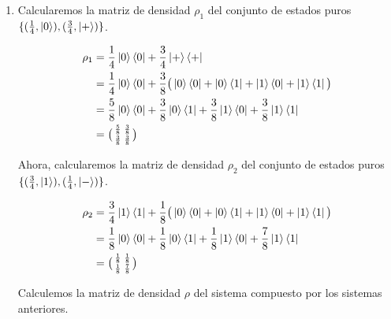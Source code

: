 \documentclass[a4paper,11pt]{article}
\begin{document}
\begin{enumerate}[label=\alph*)]

\item Calcularemos la matriz de densidad $\rho_1$ del conjunto de estados puros $\{ (\frac{1}{4}, \ket{0}), (\frac{3}{4}, \ket{+}) \}$.

\begin{align*}
  \rho_1 
  &= \frac{1}{4} \ket{0}\bra{0} + \frac{3}{4} \ket{+}\bra{+} 
  \\ &=  \frac{1}{4} \ket{0}\bra{0} + \frac{3}{8} \big( \ket{0}\bra{0} + \ket{0}\bra{1} + \ket{1}\bra{0} + \ket{1}\bra{1} \big)
  \\ &= \frac{5}{8} \ket{0}\bra{0} + \frac{3}{8}\ket{0}\bra{1} + \frac{3}{8}\ket{1}\bra{0} + \frac{3}{8}\ket{1}\bra{1}
  \\ &= \bigl(\begin{smallmatrix}
\frac{5}{8} & \frac{3}{8}\\ 
\frac{3}{8} & \frac{3}{8}
\end{smallmatrix}\bigr)
\end{align*}

Ahora, calcularemos la matriz de densidad $\rho_2$ del conjunto de estados puros $\{ (\frac{3}{4}, \ket{1}), (\frac{1}{4}, \ket{-}) \}$.

\begin{align*}
  \rho_2 
  &= \frac{3}{4} \ket{1}\bra{1} + \frac{1}{8} \big( \ket{0}\bra{0} + \ket{0}\bra{1} + \ket{1}\bra{0} + \ket{1}\bra{1} \big)
  \\ &= \frac{1}{8} \ket{0}\bra{0} + \frac{1}{8}\ket{0}\bra{1} + \frac{1}{8}\ket{1}\bra{0} + \frac{7}{8}\ket{1}\bra{1}
  \\ &= \bigl(\begin{smallmatrix}
\frac{1}{8} & \frac{1}{8}\\ 
\frac{1}{8} & \frac{7}{8}
\end{smallmatrix}\bigr)
\end{align*}

Calculemos la matriz de densidad $\rho$ del sistema compuesto por los sistemas anteriores.


\end{enumerate}
\end{document}
